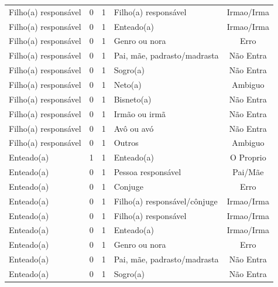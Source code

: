 \documentclass[
	12pt,				%
	openright,			%
	twoside,			%
	a4paper,			%
	english,			%
	french,				%
	spanish,			%
	brazil				%
	]{abntex2}
\begin{document}
\begin{anexosenv}
\begin{longtable}{@{}lcclc@{}}
Filho(a) responsável         & 0         & 1        & Filho(a) responsável         & Irmao/Irma      \\
Filho(a) responsável         & 0         & 1        & Enteado(a)                   & Irmao/Irma      \\
Filho(a) responsável         & 0         & 1        & Genro ou nora                & Erro            \\
Filho(a) responsável         & 0         & 1        & Pai, mãe, padrasto/madrasta  & Não Entra       \\
Filho(a) responsável         & 0         & 1        & Sogro(a)                     & Não Entra       \\
Filho(a) responsável         & 0         & 1        & Neto(a)                      & Ambiguo         \\
Filho(a) responsável         & 0         & 1        & Bisneto(a)                   & Não Entra       \\
Filho(a) responsável         & 0         & 1        & Irmão ou irmã                & Não Entra       \\
Filho(a) responsável         & 0         & 1        & Avô ou avó                   & Não Entra       \\
Filho(a) responsável         & 0         & 1        & Outros                       & Ambiguo         \\
Enteado(a)                   & 1         & 1        & Enteado(a)                   & O Proprio       \\
Enteado(a)                   & 0         & 1        & Pessoa responsável           & Pai/Mãe         \\
Enteado(a)                   & 0         & 1        & Conjuge                      & Erro            \\
Enteado(a)                   & 0         & 1        & Filho(a) responsável/cônjuge & Irmao/Irma      \\
Enteado(a)                   & 0         & 1        & Filho(a) responsável         & Irmao/Irma      \\
Enteado(a)                   & 0         & 1        & Enteado(a)                   & Irmao/Irma      \\
Enteado(a)                   & 0         & 1        & Genro ou nora                & Erro            \\
Enteado(a)                   & 0         & 1        & Pai, mãe, padrasto/madrasta  & Não Entra       \\
Enteado(a)                   & 0         & 1        & Sogro(a)                     & Não Entra       \\

\end{longtable}
\end{anexosenv}
\end{document}
